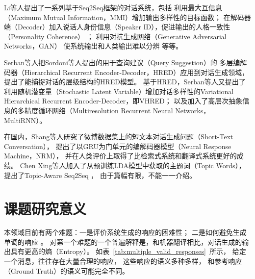 Li等人提出了一系列基于Seq2Seq框架的对话系统，包括
利用最大互信息（Maximum Mutual Information，MMI）增加输出多样性的目标函数；
在解码器端（Decoder）加入说话人身份信息（Speaker ID），促进输出的人格一致性（Personality Coherence）
；
利用对抗生成网络（Generative Adversarial Networks，GAN）
使系统输出和人类输出难以分辨 等等。

Serban等人把Sordoni等人提出的用于查询建议（Query Suggestion）的
多层编解码器（Hierarchical Recurrent Encoder-Decoder，HRED）应用到对话生成领域，
提出了能捕捉对话的层级结构的HRED模型。
基于HRED，Serban等人又提出了利用随机潜变量（Stochastic Latent Variable）增加对话多样性的Variational Hierarchical Recurrent Encoder-Decoder，即VHRED；
以及加入了高层次抽象信息的多精度循环网络（Multiresolution Recurrent Neural Networks，MultiRNN）。

在国内，Shang等人研究了微博数据集上的短文本对话生成问题（Short-Text Conversation），
提出了以GRU为门单元的编解码器模型（Neural Response Machine，NRM），
并在人类评价上取得了比检索式系统和翻译式系统更好的成绩。
Chen Xing等人加入了从预训练LDA模型中获取的主题词（Topic Words），提出了Topic-Aware Seq2Seq ，
由于篇幅有限，不能一一介绍。


\section{课题研究意义}\label{sec:research_meaning}
本领域目前有两个难题：一是评价系统生成的响应的困难性；
二是如何避免生成单调的响应
。
对第一个难题的一个普遍解释是，和机器翻译相比，对话生成的输出具有更高的熵（Entropy）。
如表~\ref{tab:multiple_valid_responses}~所示，
给定一个消息，往往存在大量合理的响应，
这些响应的语义多种多样，
和参考响应（Ground Truth）的语义可能完全不同。

